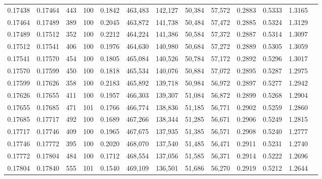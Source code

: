 \begin{tabular}{rrrrrrrrrrrrr}
0.17438 & 0.17464 &   443 & 100 &                                     0.1842 & 463,483 & 142,127 &  50,384 &  57,572 & 0.2883 & 0.5333 & 1.3165 \\
0.17464 & 0.17489 &   389 & 100 &                                     0.2045 & 463,872 & 141,738 &  50,484 &  57,472 & 0.2885 & 0.5324 & 1.3129 \\
0.17489 & 0.17512 &   352 & 100 &                                     0.2212 & 464,224 & 141,386 &  50,584 &  57,372 & 0.2887 & 0.5314 & 1.3097 \\
0.17512 & 0.17541 &   406 & 100 &                                     0.1976 & 464,630 & 140,980 &  50,684 &  57,272 & 0.2889 & 0.5305 & 1.3059 \\
0.17541 & 0.17570 &   454 & 100 &                                     0.1805 & 465,084 & 140,526 &  50,784 &  57,172 & 0.2892 & 0.5296 & 1.3017 \\
0.17570 & 0.17599 &   450 & 100 &                                     0.1818 & 465,534 & 140,076 &  50,884 &  57,072 & 0.2895 & 0.5287 & 1.2975 \\
0.17599 & 0.17626 &   358 & 100 &                                     0.2183 & 465,892 & 139,718 &  50,984 &  56,972 & 0.2897 & 0.5277 & 1.2942 \\
0.17626 & 0.17655 &   411 & 100 &                                     0.1957 & 466,303 & 139,307 &  51,084 &  56,872 & 0.2899 & 0.5268 & 1.2904 \\
0.17655 & 0.17685 &   471 & 101 &                                     0.1766 & 466,774 & 138,836 &  51,185 &  56,771 & 0.2902 & 0.5259 & 1.2860 \\
0.17685 & 0.17717 &   492 & 100 &                                     0.1689 & 467,266 & 138,344 &  51,285 &  56,671 & 0.2906 & 0.5249 & 1.2815 \\
0.17717 & 0.17746 &   409 & 100 &                                     0.1965 & 467,675 & 137,935 &  51,385 &  56,571 & 0.2908 & 0.5240 & 1.2777 \\
0.17746 & 0.17772 &   395 & 100 &                                     0.2020 & 468,070 & 137,540 &  51,485 &  56,471 & 0.2911 & 0.5231 & 1.2740 \\
0.17772 & 0.17804 &   484 & 100 &                                     0.1712 & 468,554 & 137,056 &  51,585 &  56,371 & 0.2914 & 0.5222 & 1.2696 \\
0.17804 & 0.17840 &   555 & 101 &                                     0.1540 & 469,109 & 136,501 &  51,686 &  56,270 & 0.2919 & 0.5212 & 1.2644 \\

\end{tabular}
